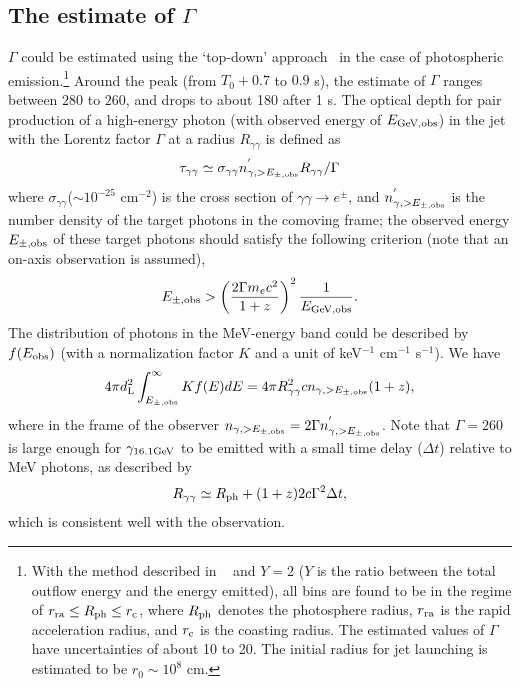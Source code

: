 \documentclass[linenumbers,twocolumn]{aastex631}
\begin{document}
\subsection{The estimate of $\Gamma$}\label{sec:esti}
$\Gamma$ could be estimated using the `top-down' approach~\citep{2015ApJ...801..103G,2024ApJ...961..137S} in the case of photospheric emission.\footnote{With the method described in ~\cite{2024ApJ...961..137S} and $Y=2$ ($Y$ is the ratio between the total outflow energy and the energy emitted), all bins are found to be in the regime of $r_{\rm ra}\leq R_{\rm ph}\leq r_{\rm c}$, where $R_{\rm ph}$ denotes the photosphere radius,  $r_{\rm ra}$ is the rapid acceleration radius, and $r_{\rm c}$ is the coasting radius. The estimated values of $\Gamma$ have uncertainties of about 10 to 20. The initial radius for jet launching is estimated to be $r_0\sim10^{8}$ cm.} Around the peak (from $T_0+0.7$ to $0.9$ s), the estimate of $\Gamma$ ranges between $280$ to $260$, and drops to about 180 after 1 s. The optical depth for pair production of a high-energy photon (with observed energy of $E_{\rm GeV, obs}$) in the jet with the Lorentz factor $\Gamma$ at a radius $R_{\gamma\gamma}$ is defined as
\begin{equation}\label{eq:taugg}
\tau_{\gamma\gamma}\simeq \sigma_{\gamma\gamma} n^{'}_{\gamma, >E_{\pm, \rm obs}}R_{\gamma\gamma} /\Gamma   
\end{equation}
 where $\sigma_{\gamma\gamma}$($\sim10^{-25}$ cm$^{-2}$) is the cross section of $\gamma\gamma\rightarrow e^{\pm}$, and $n^{'}_{\gamma, >E_{\pm,\rm obs}}$ is the number density of the target photons in the comoving frame; the observed energy $E_{\pm, \rm obs}$ of these target photons should satisfy the following criterion (note that an on-axis observation is assumed),
\begin{equation}\label{eq:Eobs}
 E_{\pm, \rm obs}>\left(\frac{2\Gamma m_ec^2}{1+z}\right)^2\frac{1}{E_{\rm GeV, obs}}.  
\end{equation}
The distribution of photons in the MeV-energy band could be described by $f(E_{\rm obs})$ (with a normalization factor $K$ and a unit of keV$^{-1}$ cm$^{-1}$ s$^{-1}$). We have %
\begin{eqnarray}\label{eq:Eobs2}
     4\pi d^2_{\rm L}\int_{E_{\pm,\rm obs}}^\infty Kf(E)dE =4\pi R_{\gamma\gamma}^2 c n_{\gamma, >E_{\pm,\rm obs}}(1+z),
\end{eqnarray}
where in the frame of the observer $n_{\gamma, >E_{\pm,\rm obs}}=2\Gamma n^{'}_{\gamma, >E_{\pm,\rm obs}}$. Note that  $\Gamma=260$ is large enough for $\gamma_{16.1 \rm GeV}$ to be emitted with a small time delay ($\Delta t$) relative to MeV photons, as described by
\begin{equation}
   R_{\gamma\gamma}\simeq R_{\rm ph} +(1+z)2c\Gamma^2\Delta t,
\end{equation}
which is consistent well with the observation. 
\end{document}
